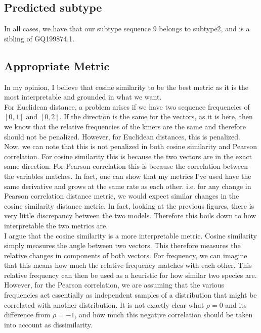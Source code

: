 \documentclass[10pt]{article}
\begin{document}
\subsection*{Predicted subtype}
In all cases, we have that our subtype sequence 9 belongs to subtype2, and is a sibling of GQ199874.1.

\subsection*{Appropriate Metric}
In my opinion, I believe that cosine similarity to be the best metric as it is the most interpretable and grounded in what we want.\\

For Euclidean distance, a problem arises if we have two sequence frequencies of $[0, 1]$ and $[0, 2]$. If the direction is the same for the vectors, as it is here, then we know that the relative frequencies of the kmers are the same and therefore should not be penalized. However, for Euclidean distances, this is penalized.\\

Now, we can note that this is not penalized in both cosine similarity and Pearson correlation. For cosine similarity this is because the two vectors are in the exact same direction. For Pearson correlation this is because the correlation between the variables matches. In fact, one can show that my metrics I've used have the same derivative and grows at the same rate as each other. i.e. for any change in Pearson correlation distance metric, we would expect similar changes in the cosine similarity distance metric. In fact, looking at the previous figures, there is very little discrepancy between the two models. Therefore this boils down to how interpretable the two metrics are.\\

I argue that the cosine similarity is a more interpretable metric. Cosine similarity simply measures the angle between two vectors. This therefore measures the relative changes in components of both vectors. For frequency, we can imagine that this means how much the relative frequency matches with each other. This relative frequency can then be used as a heuristic for how similar two species are.\\

However, for the Pearson correlation, we are assuming that the various frequencies act essentially as independent samples of a distribution that might be correlated with another distribution. It is not exactly clear what $\rho = 0$ and its difference from $\rho = -1$, and how much this negative correlation should be taken into account as dissimilarity.\\
\end{document}
